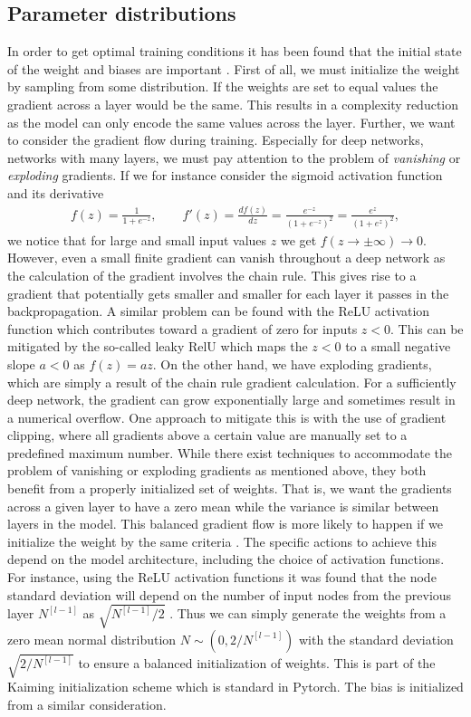 \subsection{Parameter distributions}
In order to get optimal training conditions it has been found that the initial
state of the weight and biases are important \cite{salimans2016weight}. First of all, we must initialize the weight by sampling from some distribution. If the weights are set
to equal values the gradient across a layer would be the same. This results in a
complexity reduction as the model can only encode the same values across the
layer. Further, we want to consider the gradient flow during training. Especially for deep networks, networks with many layers, we must pay attention to the problem of \textit{vanishing} or \textit{exploding} gradients. If we for instance consider the sigmoid activation function and its derivative 
\begin{align*}
  f(z) = \frac{1}{1 + e^{-z}}, \qquad f'(z) = \frac{df(z)}{dz} = \frac{e^{-z}}{(1+e^{-z})^2} = \frac{e^{z}}{(1+e^{z})^2},
\end{align*}
we notice that for large and small input values $z$ we get $f(z\to \pm\infty)
\to 0$. However, even a small finite gradient can vanish throughout a deep
network as the calculation of the gradient involves the chain rule. This gives
rise to a gradient that potentially gets smaller and smaller for each layer it
passes in the backpropagation. A similar problem can be found with the ReLU
activation function which contributes toward a gradient of zero for inputs
$z<0$. This can be mitigated by the so-called leaky RelU which maps the $z<0$ to
a small negative slope $a<0$ as $f(z) = az$. On the other hand, we have
exploding gradients, which are simply a result of the chain rule gradient
calculation. For a sufficiently deep network, the gradient can grow
exponentially large and sometimes result in a numerical overflow. One approach
to mitigate this is with the use of gradient clipping, where all gradients above
a certain value are manually set to a predefined maximum number. While there
exist techniques to accommodate the problem of vanishing or exploding gradients
as mentioned above, they both benefit from a properly initialized set of
weights. That is, we want the gradients across a given layer to have a zero mean
while the variance is similar between layers in the model. This balanced
gradient flow is more likely to happen if we initialize the weight by the same
criteria \cite{salimans2016weight}. The specific actions to achieve this depend
on the model architecture, including the choice of activation functions. For
instance, using the ReLU activation functions it was found that the node
standard deviation will depend on the number of input nodes from the previous
layer $N^{[l-1]}$ as $\sqrt{N^{[l-1]}/2}$ \cite{he2015delving}. Thus we can
simply generate the weights from a zero mean normal distribution $N \sim (0,
2/N^{[l-1]})$ with the standard deviation $\sqrt{2/N^{[l-1]}}$ to ensure a balanced initialization of weights. This is part of the Kaiming initialization scheme which is standard in Pytorch.
The bias is initialized from a similar consideration.

